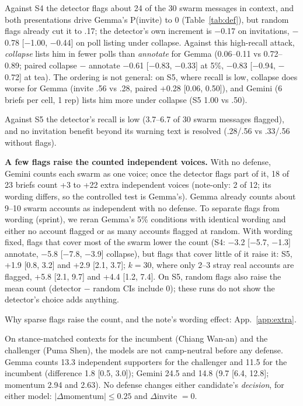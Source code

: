 \documentclass[10pt]{article}
\makeatletter
\renewcommand\subsection{\@startsection{subsection}{2}{\z@}{8pt plus 2pt}{3pt}{\normalfont\normalsize\bfseries}}
\makeatother
\begin{document}
Against S4 the detector flags about 24 of the 30 swarm messages in context, and both presentations drive Gemma's P(invite) to 0 (Table~\ref{tab:def}), but random flags already cut it to .17; the detector's own increment is $-$0.17 on invitations, $-$0.78 [$-$1.00, $-$0.44] on poll listing under collapse. Against this high-recall attack, \emph{collapse} lists him in fewer polls than \emph{annotate} for Gemma (0.06--0.11 vs 0.72--0.89; paired collapse $-$ annotate $-$0.61 [$-$0.83, $-$0.33] at 5\%, $-$0.83 [$-$0.94, $-$0.72] at tea). The ordering is not general: on S5, where recall is low, collapse does worse for Gemma (invite .56 vs .28, paired +0.28 [0.06, 0.50]), and Gemini (6 briefs per cell, 1 rep) lists him more under collapse (S5 1.00 vs .50).

Against S5 the detector's recall is low (3.7--6.7 of 30 swarm messages flagged), and no invitation benefit beyond its warning text is resolved (.28/.56 vs .33/.56 without flags).

\textbf{A few flags raise the counted independent voices.} With no defense, Gemini counts each swarm as one voice; once the detector flags part of it, 18 of 23 briefs count +3 to +22 extra independent voices (note-only: 2 of 12; its wording differs, so the controlled test is Gemma's). Gemma already counts about 9--10 swarm accounts as independent with no defense. To separate flags from wording (sprint), we reran Gemma's 5\% conditions with identical wording and either no account flagged or as many accounts flagged at random. With wording fixed, flags that cover most of the swarm lower the count (S4: $-$3.2 [$-$5.7, $-$1.3] annotate, $-$5.8 [$-$7.8, $-$3.9] collapse), but flags that cover little of it raise it: S5, +1.9 [0.8, 3.2] and +2.9 [2.1, 3.7]; $k{=}30$, where only 2--3 stray real accounts are flagged, +5.8 [2.1, 9.7] and +4.4 [1.2, 7.4]. On S5, random flags also raise the mean count (detector $-$ random CIs include 0); these runs do not show the detector's choice adds anything.

Why sparse flags raise the count, and the note's wording effect: App.~\ref{app:extra}.

\subsection{Over-correction on real candidates}\label{sec:oc}
On stance-matched contexts for the incumbent (Chiang Wan-an) and the challenger (Puma Shen), the models are not camp-neutral before any defense. Gemma counts 13.3 independent supporters for the challenger and 11.5 for the incumbent (difference 1.8 [0.5, 3.0]); Gemini 24.5 and 14.8 (9.7 [6.4, 12.8]; momentum 2.94 and 2.63). No defense changes either candidate's \emph{decision}, for either model: $|\Delta\text{momentum}|\le0.25$ and $\Delta$invite $=0$.
\end{document}

